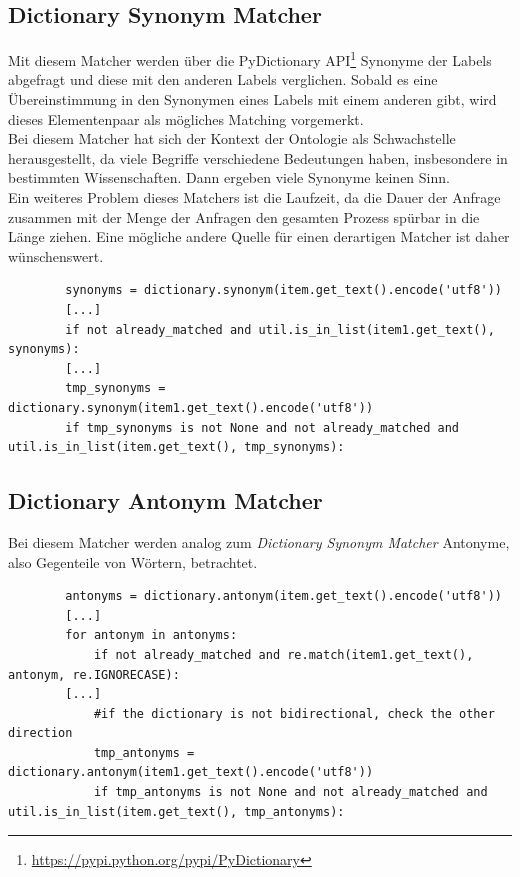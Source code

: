 		\subsection{Dictionary Synonym Matcher}
		Mit diesem Matcher werden über die PyDictionary
		API\footnote{\url{https://pypi.python.org/pypi/PyDictionary}} Synonyme der
		Labels abgefragt und diese mit den anderen Labels verglichen. Sobald es eine
		Übereinstimmung in den Synonymen eines Labels mit einem anderen gibt, wird
		dieses Elementenpaar als mögliches Matching vorgemerkt.\\
		Bei diesem Matcher hat sich der Kontext der Ontologie als Schwachstelle
		herausgestellt, da viele Begriffe verschiedene Bedeutungen haben, insbesondere
		in bestimmten Wissenschaften. Dann ergeben viele Synonyme keinen Sinn.\\
		Ein weiteres Problem dieses Matchers ist die Laufzeit, da die Dauer der
		Anfrage zusammen mit der Menge der Anfragen den gesamten Prozess spürbar in
		die Länge ziehen. Eine mögliche andere Quelle für einen derartigen Matcher ist
		daher wünschenswert.
		\begin{lstlisting}
		synonyms = dictionary.synonym(item.get_text().encode('utf8'))
		[...]
		if not already_matched and util.is_in_list(item1.get_text(), synonyms):
		[...]
		tmp_synonyms = dictionary.synonym(item1.get_text().encode('utf8'))
		if tmp_synonyms is not None and not already_matched and	util.is_in_list(item.get_text(), tmp_synonyms):
		\end{lstlisting}
		
		\subsection{Dictionary Antonym Matcher}
		Bei diesem Matcher werden analog zum \textit{Dictionary Synonym Matcher}
		Antonyme, also Gegenteile von Wörtern, betrachtet.
		\begin{lstlisting}
		antonyms = dictionary.antonym(item.get_text().encode('utf8'))
		[...]
		for antonym in antonyms:
        	if not already_matched and re.match(item1.get_text(), antonym, re.IGNORECASE):
		[...]
		    #if the dictionary is not bidirectional, check the other direction
            tmp_antonyms = dictionary.antonym(item1.get_text().encode('utf8'))
            if tmp_antonyms is not None and not already_matched and util.is_in_list(item.get_text(), tmp_antonyms):
		\end{lstlisting}
		
